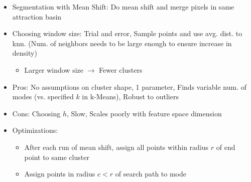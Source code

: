 \documentclass{article}
\begin{document}
\begin{multicols*}{3}
\begin{itemize}
    \begin{itemize}
        \item Segmentation with Mean Shift: Do mean shift and merge pixels in same attraction basin
        \item Choosing window size: Trial and error, Sample points and use avg. dist. to knn. (Num. of neighbors needs to be large enough to ensure increase in density)
        \begin{itemize}
            \item Larger window size $\rightarrow$ Fewer clusters
        \end{itemize}
        \item Pros: No assumptions on cluster shape, 1 parameter, Finds variable num. of modes (vs. specified $k$ in k-Means), Robust to outliers
        \item Cons: Choosing $h$, Slow, Scales poorly with feature space dimension
        \item Optimizations:
        \begin{itemize}
            \item After each run of mean shift, assign all points within radius $r$ of end point to same cluster
            \item Assign points in radius $c < r$ of search path to mode
        \end{itemize}
    \end{itemize}
\end{itemize}

\end{multicols*}
\end{document}
